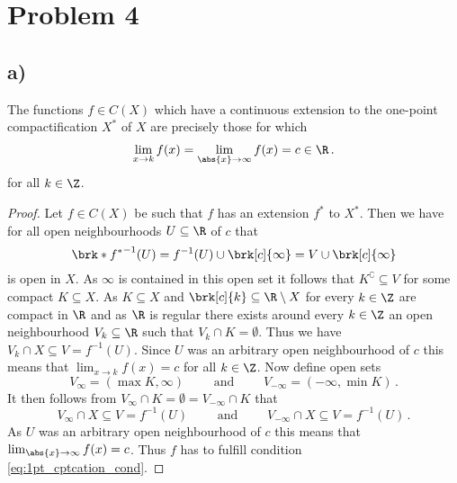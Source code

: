 \section{Problem 4}
\subsection{a)}
\begin{claim}
The functions $f\in C(X)$ which have a continuous extension to the one-point compactification $X^*$ of $X$ are precisely those for which
\begin{align}
	\lim_{x\to k}f(x)=\lim_{\abs{x}\to\infty}f(x)=c\in\R\label{eq:1pt_cptcation_cond}\,.
\end{align}
for all $k\in\Z$.
\end{claim}
\begin{proof}
Let $f\in C(X)$ be such that $f$ has an extension $f^*$ to $X^*$. Then we have for all open neighbourhoods $U\subseteq\R$ of $c$ that $$\brk*{f^*}^{-1}(U)=f^{-1}(U)\cup\brk[c]{\infty}=V\cup \brk[c]{\infty}$$ is open in $X$. As $\infty$ is contained in this open set it follows that $K^\complement\subseteq V$ for some compact $K\subseteq X$. As $K\subseteq X$ and $\brk[c]{k}\subseteq \R\setminus X$ for every $k\in\Z$ are compact in $\R$ and as $\R$ is regular there exists around every $k\in\Z$ an open neighbourhood $V_k\subseteq \R$ such that $V_k\cap K=\emptyset$. Thus we have $V_k\cap X\subseteq V= f^{-1}(U)$. Since $U$ was an arbitrary open neighbourhood of $c$ this means that $\lim_{x\to k}f(x)=c$ for all $k\in\Z$. Now define open sets
$$V_\infty=(\max K, \infty)\qquad\text{ and }\qquad V_{-\infty}=(-\infty,\min K)\,.$$
It then follows from $V_\infty\cap K=\emptyset=V_{-\infty}\cap K$ that 
$$V_\infty\cap X\subseteq V=f^{-1}(U) \qquad\text{ and }\qquad V_{-\infty}\cap X\subseteq V=f^{-1}(U)\,.$$
As $U$ was an arbitrary open neighbourhood of $c$ this means that $\lim_{\abs{x}\to\infty}f(x)=c$. Thus $f$ has to fulfill condition \ref{eq:1pt_cptcation_cond}.



\end{proof}
